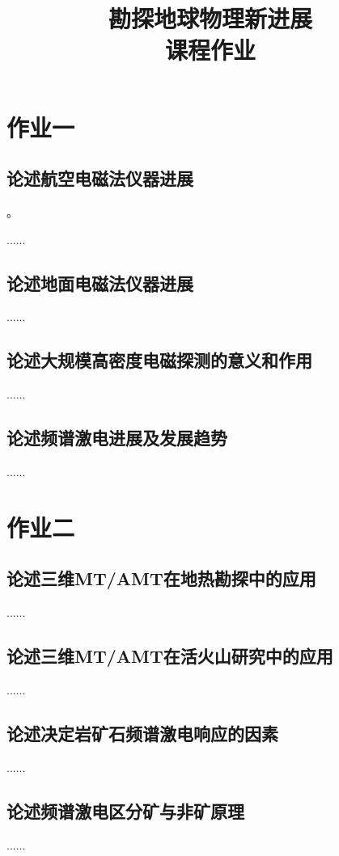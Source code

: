 \documentclass{coursework}
\title{勘探地球物理新进展\\课程作业}%
\begin{document}
	\maketitle	
	\section{作业一}
	\subsection{论述航空电磁法仪器进展}
	\citep{Fountain1998,AUKEN201747}。
	
	......
	\subsection{论述地面电磁法仪器进展}
	......
	\subsection{论述大规模高密度电磁探测的意义和作用}
	......
	\subsection{论述频谱激电进展及发展趋势}
	......
	
	\section{作业二}
	\subsection{论述三维MT/AMT在地热勘探中的应用}
	......	
	\subsection{论述三维MT/AMT在活火山研究中的应用}
	......	
	\subsection{论述决定岩矿石频谱激电响应的因素}
	......	
	\subsection{论述频谱激电区分矿与非矿原理}
	......	
	
\end{document}
